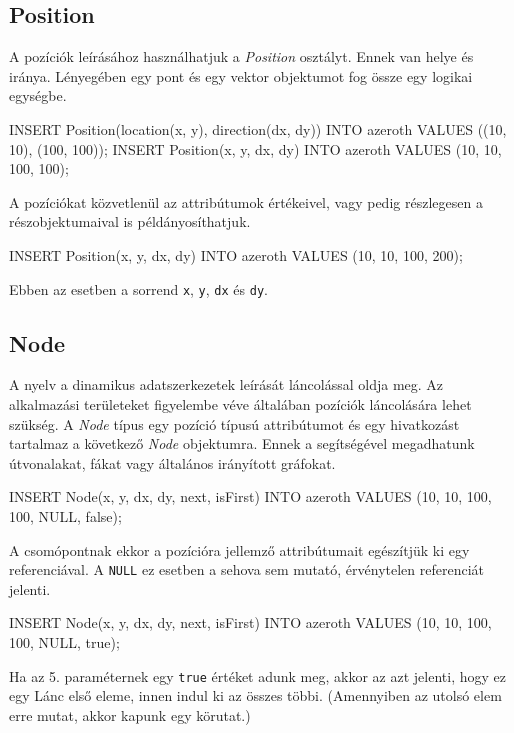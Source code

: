 \subsection{Position}

A pozíciók leírásához használhatjuk a \textit{Position} osztályt. Ennek van helye és iránya. Lényegében egy pont és egy vektor objektumot fog össze egy logikai egységbe.

\begin{sql}
INSERT Position(location(x, y), direction(dx, dy)) INTO
azeroth VALUES ((10, 10), (100, 100));
INSERT Position(x, y, dx, dy) INTO azeroth VALUES (10, 10, 100, 100);
\end{sql}

A pozíciókat közvetlenül az attribútumok értékeivel, vagy pedig részlegesen a részobjektumaival is példányosíthatjuk.

\begin{sql}
INSERT Position(x, y, dx, dy) INTO azeroth VALUES (10, 10, 100, 200);
\end{sql}

Ebben az esetben a sorrend \texttt{x}, \texttt{y}, \texttt{dx} és \texttt{dy}. 


\subsection{Node}

A nyelv a dinamikus adatszerkezetek leírását láncolással oldja meg. Az alkalmazási területeket figyelembe véve általában pozíciók láncolására lehet szükség. A \textit{Node} típus egy pozíció típusú attribútumot és egy hivatkozást tartalmaz a következő \textit{Node} objektumra. Ennek a segítségével megadhatunk útvonalakat, fákat vagy általános irányított gráfokat.

\begin{sql}
INSERT Node(x, y, dx, dy, next, isFirst) INTO 
azeroth VALUES (10, 10, 100, 100, NULL, false);
\end{sql}

A csomópontnak ekkor a pozícióra jellemző attribútumait egészítjük ki egy referenciával. A \texttt{NULL} ez esetben a sehova sem mutató, érvénytelen referenciát jelenti.


\begin{sql}
INSERT Node(x, y, dx, dy, next, isFirst) INTO 
azeroth VALUES (10, 10, 100, 100, NULL, true);
\end{sql}

Ha az 5. paraméternek egy \texttt{true} értéket adunk meg, akkor az azt jelenti, hogy ez egy Lánc első eleme, innen indul ki az összes többi. (Amennyiben az utolsó elem erre mutat, akkor kapunk egy körutat.)

